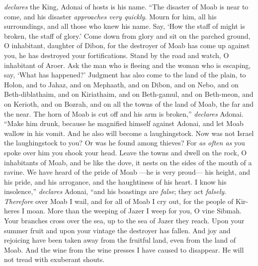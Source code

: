 \begin{biblechapter}
\textit{declares} the King, Adonai of hosts is his name.
\verse “The disaster of Moab is near to come, 
and his disaster \textit{approaches very quickly}.
\verse Mourn for him, all his surroundings, 
and all those who knew his name. 
Say, ‘How the staff of might is broken, 
the staff of glory.’
\verse Come down from glory and sit on the parched ground, 
O inhabitant, daughter of Dibon, 
for the destroyer of Moab has come up against you, 
he has destroyed your fortifications.
\verse Stand by the road and watch, 
O inhabitant of Aroer. 
Ask the man who is fleeing and the woman who is escaping, 
say, ‘What has happened?’
\verse Judgment has also come to the land of the plain, to Holon, and to Jahaz, and on Mephaath,
\verse and on Dibon, and on Nebo, and on Beth-diblathaim,
\verse and on Kiriathaim, and on Beth-gamul, and on Beth-meon,
\verse and on Kerioth, and on Bozrah, and on all the towns of the land of Moab, the far and the near.
\verse The horn of Moab is cut off and his arm is broken,” \textit{declares} Adonai.
\verse “Make him drunk, 
because he magnified himself against Adonai, 
and let Moab wallow in his vomit. 
And he also will become a laughingstock.
\verse Now was not Israel the laughingstock to you? 
Or was he found among thieves? 
For \textit{as often as} you spoke over him 
you shook your head.
\verse Leave the towns and dwell on the rock, 
O inhabitants of Moab, 
and be like the dove, 
it nests on the sides of the mouth of a ravine.
\verse We have heard of the pride of Moab 
—he is very proud— 
his height, and his pride, and his arrogance, 
and the haughtiness of his heart.
\verse I know his insolence,” \textit{declares} Adonai, 
“and his boastings are \textit{false}; 
they act \textit{falsely}.
\verse \textit{Therefore} over Moab I wail, 
and for all of Moab I cry out, 
for the people of Kir-heres I moan.
\verse More than the weeping of Jazer 
I weep for you, O vine Sibmah. 
Your branches cross over the sea, 
up to the sea of Jazer they reach. 
Upon your summer fruit and upon your vintage 
the destroyer has fallen.
\verse And joy and rejoicing have been taken away from the fruitful land, 
even from the land of Moab. 
And the wine from the wine presses 
I have caused to disappear. 
He will not tread with exuberant shouts. 

\end{biblechapter}
